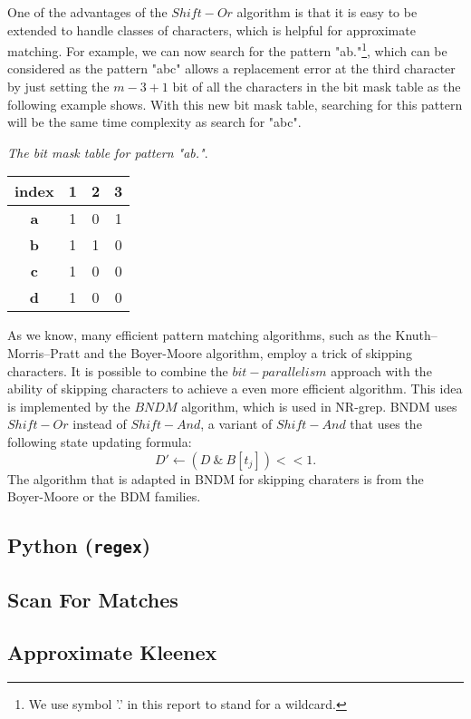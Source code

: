 One of the advantages of the $Shift-Or$ algorithm is that it is easy to be extended to handle classes of characters, which is helpful for approximate matching. 
For example, we can now search for the pattern "ab."\footnote{ We use symbol '.' in this report to stand for a wildcard.}, which can be considered as the pattern "abc" allows a replacement error at the third character by just setting the $m-3+1$ bit of all the characters in the bit mask table as the following example shows. With this new bit mask table, searching for this pattern will be the same time complexity as search for "abc".

\begin{example}\emph{The bit mask table for pattern "ab."}.
	\begin{table}[H]
		\centering
		\begin{tabular}{|c|c|c|c|}
			\hline
			index      & 1                        & 2                        & 3                        \\ \hline
			\textbf{a} & {\color{red} 1}                   & 0                        & {\color[HTML]{3531FF} 1} \\ \hline
			\textbf{b} &  {\color{red} 1}                    & {\color[HTML]{3531FF} 1} & 0                        \\ \hline
			\textbf{c} & {\color[HTML]{3531FF} 1} & 0                        & 0                        \\ \hline
			\textbf{d} &{\color{red} 1}                    & 0                        & 0                        \\ \hline
		\end{tabular}
		\label{table-bitmask2}
	\end{table}
\end{example}
 
 
As we know, many efficient pattern matching algorithms, such as the Knuth–Morris–Pratt and the Boyer-Moore algorithm, employ a trick of skipping characters. It is possible to combine the $bit-parallelism$ approach with the ability of skipping characters to achieve a even more efficient algorithm. This idea is implemented by the $BNDM$ algorithm, which is used in NR-grep. BNDM uses $Shift-Or$ instead of $Shift-And$, a variant of $Shift-And$ that uses the following state updating formula:  
$$ D' \leftarrow  (D \ \& \ B[t_j]) << 1 .$$ The algorithm that is adapted in BNDM for skipping charaters is from the Boyer-Moore or the BDM families\cite{crochemore94}.
 


\subsection{Python (\texttt{regex})}

\subsection{Scan For Matches}


\subsection{Approximate Kleenex}